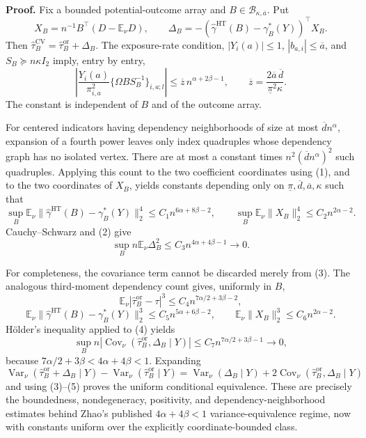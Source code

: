 \textbf{Proof.}
Fix a bounded potential-outcome array and \(B\in\mathcal B_{\kappa,\overline a}\).  Put
\[
X_B=n^{-1}B^{\top}(D-\mathbb E_\nu D),
\qquad
\Delta_B=-(\widehat\gamma^{\mathrm{HT}}(B)-\gamma_B^*(Y))^{\top}X_B.
\]
Then \(\widehat\tau_B^{\mathrm{CV}}=\widehat\tau_B^{\mathrm{or}}+\Delta_B\).  The exposure-rate condition, \(|Y_i(a)|\le1\), \(|b_{a,i}|\le\overline a\), and \(S_B\succeq n\kappa I_2\) imply, entry by entry,
\[
\left|\frac{Y_i(a)}{\pi_{i,a}^2}
\{\Omega B S_B^{-1}\}_{i,a;l}\right|
\le \overline z\,n^{\alpha+2\beta-1},
\qquad
\overline z=\frac{2\overline a\,\overline d}{\underline\pi^2\kappa}. \tag{1}
\]
The constant is independent of \(B\) and of the outcome array.

For centered indicators having dependency neighborhoods of size at most \(\overline d n^\alpha\), expansion of a fourth power leaves only index quadruples whose dependency graph has no isolated vertex.  There are at most a constant times \(n^2(\overline d n^\alpha)^2\) such quadruples.  Applying this count to the two coefficient coordinates using (1), and to the two coordinates of \(X_B\), yields constants depending only on \(\underline\pi,\overline d,\overline a,\kappa\) such that
\[
\sup_B\mathbb E_\nu
\lVert\widehat\gamma^{\mathrm{HT}}(B)-\gamma_B^*(Y)\rVert_2^4
\le C_1n^{6\alpha+8\beta-2},
\qquad
\sup_B\mathbb E_\nu\lVert X_B\rVert_2^4
\le C_2n^{2\alpha-2}. \tag{2}
\]
Cauchy--Schwarz and (2) give
\[
\sup_B n\mathbb E_\nu\Delta_B^2
\le C_3n^{4\alpha+4\beta-1}\longrightarrow0. \tag{3}
\]

For completeness, the covariance term cannot be discarded merely from (3).  The analogous third-moment dependency count gives, uniformly in \(B\),
\[
\mathbb E_\nu|\widehat\tau_B^{\mathrm{or}}-\tau|^3
\le C_4n^{7\alpha/2+3\beta-2},
\]
\[
\mathbb E_\nu\lVert\widehat\gamma^{\mathrm{HT}}(B)-\gamma_B^*(Y)\rVert_2^3
\le C_5n^{5\alpha+6\beta-2},
\qquad
\mathbb E_\nu\lVert X_B\rVert_2^3
\le C_6n^{2\alpha-2}. \tag{4}
\]
H\"older's inequality applied to (4) yields
\[
\sup_B n\left|
\operatorname{Cov}_\nu(\widehat\tau_B^{\mathrm{or}},\Delta_B\mid Y)
\right|
\le C_7n^{7\alpha/2+3\beta-1}\longrightarrow0, \tag{5}
\]
because \(7\alpha/2+3\beta<4\alpha+4\beta<1\).  Expanding
\[
\operatorname{Var}_\nu(\widehat\tau_B^{\mathrm{or}}+\Delta_B\mid Y)
-\operatorname{Var}_\nu(\widehat\tau_B^{\mathrm{or}}\mid Y)
=\operatorname{Var}_\nu(\Delta_B\mid Y)
+2\operatorname{Cov}_\nu(\widehat\tau_B^{\mathrm{or}},\Delta_B\mid Y)
\]
and using (3)--(5) proves the uniform conditional equivalence.  These are precisely the boundedness, nondegeneracy, positivity, and dependency-neighborhood estimates behind Zhao's published \(4\alpha+4\beta<1\) variance-equivalence regime, now with constants uniform over the explicitly coordinate-bounded class.

